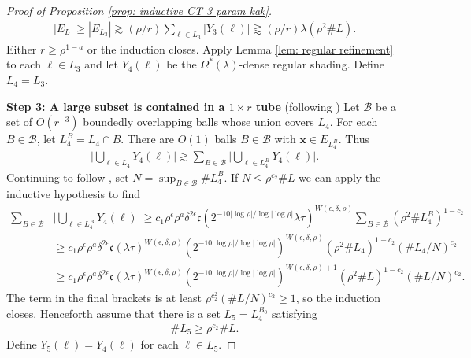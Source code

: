 \documentclass[12pt]{amsart}
\newcommand{\x}{{\bf{x}}}
\numberwithin{equation}{section}
\newtheorem{remark}[lemma]{Remark}
\newcommand{\1}{\mathbbm{1}}
\renewcommand{\x}{\mathbf x}
\begin{document}
\begin{proof}[Proof of Proposition \ref{prop: inductive CT 3 param kak}]
    \begin{align}\label{eq: trivial narrow}
        |E_{L}| \geq |E_{L_3}| \gtrsim (\rho / r) \sum_{\ell \in L_3} |Y_3(\ell)| \gtrapprox (\rho / r) \lambda (\rho^2 \# L). 
    \end{align}
    Either $r \geq \rho^{1-a}$ or the induction closes.
    Apply Lemma \ref{lem: regular refinement} to each $\ell \in L_3$ and let $Y_4(\ell)$ be the $\Omega^*(\lambda)$-dense regular shading. Define $L_4 = L_3$. 

    \medskip
    
    \noindent \textbf{Step 3: A large subset is contained in a $1 \times r$ tube} (following \cite[Step 3 pg. 17]{KWZ})
    Let $\mathcal B$ be a set of $O(r^{-3})$ boundedly overlapping balls whose union covers $L_4$. For each $B \in \mathcal B$, let $L_4^B = L_4 \cap B$. There are $O(1)$ balls $B \in \mathcal B$ with $\x \in E_{L_4^B}$. Thus 
    \begin{align}
        \Big |\bigcup_{\ell \in L_4} Y_4(\ell)\Big | \gtrsim \sum_{B \in \mathcal B} \Big |\bigcup_{\ell \in L_4^B} Y_4(\ell)\Big | .
    \end{align}
    Continuing to follow \cite{KWZ}, set $N = \sup_{B \in \mathcal B} \# L_4^B$. 
    If $N \leq \rho^{c_2} \# L$ we can apply the inductive hypothesis to find
    \begin{align}
        \sum_{B \in \mathcal B} &\Big|\bigcup_{\ell \in L_4^B} Y_4(\ell)\Big | \geq c_1 \rho^\epsilon \rho^a \delta^{2\epsilon} \mathfrak{c} (2^{-10 |\log \rho|/\log|\log \rho|}
        \lambda \tau)^{W(\epsilon, \delta, \rho)} \sum_{B \in \mathcal B} (\rho^2 \# L_4^B)^{1-c_2} \\ 
        &\geq c_1 \rho^\epsilon \rho^a \delta^{2\epsilon} \mathfrak{c}(\lambda \tau)^{W(\epsilon, \delta, \rho)} (2^{-10 |\log \rho|/\log|\log \rho|})^{W(\epsilon, \delta, \rho)}
        (\rho^2 \# L_4)^{1-c_2} (\# L_4 / N)^{c_2} \\
        &\geq c_1 \rho^\epsilon \rho^a \delta^{2\epsilon} \mathfrak{c} (\lambda \tau)^{W(\epsilon, \delta, \rho)}  (2^{-10 |\log \rho|/\log|\log \rho|})^{W(\epsilon, \delta, \rho) + 1} (\rho^2 \# L)^{1-c_2}(\# L / N)^{c_2}.
    \end{align}
    The term in the final brackets is at least  $\rho^{c^2_2} (\# L / N)^{c_2} \geq 1$, so the induction closes. Henceforth assume that there is a set $L_5 = L_4^{B_0}$ satisfying 
    \begin{align}\label{eq: size of L}
        \# L_5 \geq \rho^{c_2} \# L.
    \end{align}
    Define $Y_5(\ell) = Y_4(\ell)$ for each $\ell \in L_5$. 


\end{proof}
\end{document}
